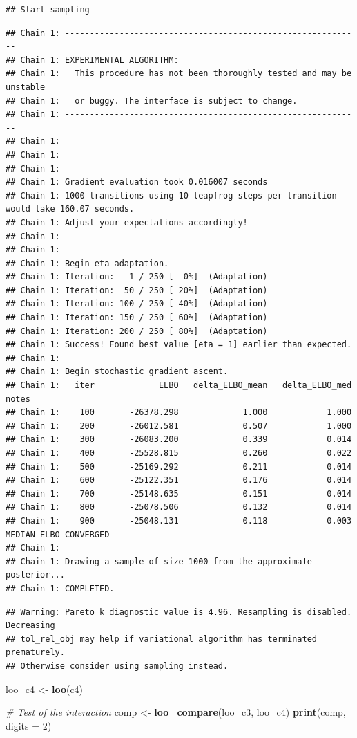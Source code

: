 \documentclass[
]{article}
\newenvironment{Shaded}{\begin{snugshade}}{\end{snugshade}}
\newcommand{\AttributeTok}[1]{\textcolor[rgb]{0.13,0.29,0.53}{#1}}
\newcommand{\CommentTok}[1]{\textcolor[rgb]{0.56,0.35,0.01}{\textit{#1}}}
\newcommand{\DecValTok}[1]{\textcolor[rgb]{0.00,0.00,0.81}{#1}}
\newcommand{\FunctionTok}[1]{\textcolor[rgb]{0.13,0.29,0.53}{\textbf{#1}}}
\newcommand{\NormalTok}[1]{#1}
\newcommand{\OtherTok}[1]{\textcolor[rgb]{0.56,0.35,0.01}{#1}}
\begin{document}
\begin{verbatim}
## Start sampling
\end{verbatim}

\begin{verbatim}
## Chain 1: ------------------------------------------------------------
## Chain 1: EXPERIMENTAL ALGORITHM:
## Chain 1:   This procedure has not been thoroughly tested and may be unstable
## Chain 1:   or buggy. The interface is subject to change.
## Chain 1: ------------------------------------------------------------
## Chain 1: 
## Chain 1: 
## Chain 1: 
## Chain 1: Gradient evaluation took 0.016007 seconds
## Chain 1: 1000 transitions using 10 leapfrog steps per transition would take 160.07 seconds.
## Chain 1: Adjust your expectations accordingly!
## Chain 1: 
## Chain 1: 
## Chain 1: Begin eta adaptation.
## Chain 1: Iteration:   1 / 250 [  0%]  (Adaptation)
## Chain 1: Iteration:  50 / 250 [ 20%]  (Adaptation)
## Chain 1: Iteration: 100 / 250 [ 40%]  (Adaptation)
## Chain 1: Iteration: 150 / 250 [ 60%]  (Adaptation)
## Chain 1: Iteration: 200 / 250 [ 80%]  (Adaptation)
## Chain 1: Success! Found best value [eta = 1] earlier than expected.
## Chain 1: 
## Chain 1: Begin stochastic gradient ascent.
## Chain 1:   iter             ELBO   delta_ELBO_mean   delta_ELBO_med   notes 
## Chain 1:    100       -26378.298             1.000            1.000
## Chain 1:    200       -26012.581             0.507            1.000
## Chain 1:    300       -26083.200             0.339            0.014
## Chain 1:    400       -25528.815             0.260            0.022
## Chain 1:    500       -25169.292             0.211            0.014
## Chain 1:    600       -25122.351             0.176            0.014
## Chain 1:    700       -25148.635             0.151            0.014
## Chain 1:    800       -25078.506             0.132            0.014
## Chain 1:    900       -25048.131             0.118            0.003   MEDIAN ELBO CONVERGED
## Chain 1: 
## Chain 1: Drawing a sample of size 1000 from the approximate posterior... 
## Chain 1: COMPLETED.
\end{verbatim}

\begin{verbatim}
## Warning: Pareto k diagnostic value is 4.96. Resampling is disabled. Decreasing
## tol_rel_obj may help if variational algorithm has terminated prematurely.
## Otherwise consider using sampling instead.
\end{verbatim}

\begin{Shaded}
\begin{Highlighting}[]
\NormalTok{loo\_c4 }\OtherTok{\textless{}{-}} \FunctionTok{loo}\NormalTok{(c4)}

\CommentTok{\# Test of the interaction}
\NormalTok{comp }\OtherTok{\textless{}{-}} \FunctionTok{loo\_compare}\NormalTok{(loo\_c3, loo\_c4)}
\FunctionTok{print}\NormalTok{(comp, }\AttributeTok{digits =} \DecValTok{2}\NormalTok{)}
\end{Highlighting}
\end{Shaded}
\end{document}
